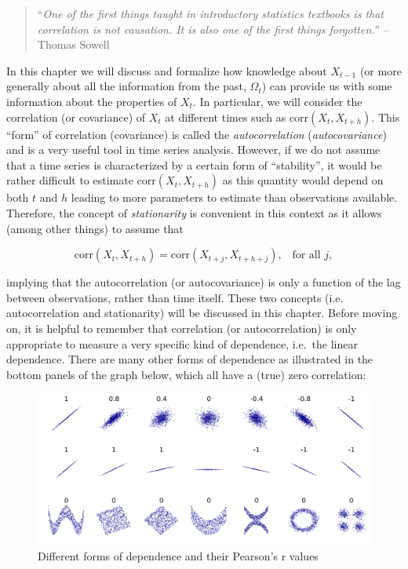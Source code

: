 \documentclass[]{book}
\theoremstyle{definition}
\theoremstyle{definition}
\theoremstyle{definition}
\theoremstyle{remark}
\begin{document}
\begin{quote}
``\emph{One of the first things taught in introductory statistics
textbooks is that correlation is not causation. It is also one of the
first things forgotten.}'' -- Thomas Sowell
\end{quote}

In this chapter we will discuss and formalize how knowledge about
\(X_{t-1}\) (or more generally about all the information from the past,
\(\Omega_t\)) can provide us with some information about the properties
of \(X_t\). In particular, we will consider the correlation (or
covariance) of \(X_t\) at different times such as
\(\text{corr} \left(X_t, X_{t+h}\right)\). This ``form'' of correlation
(covariance) is called the \emph{autocorrelation}
(\emph{autocovariance}) and is a very useful tool in time series
analysis. However, if we do not assume that a time series is
characterized by a certain form of ``stability'', it would be rather
difficult to estimate \(\text{corr} \left(X_t, X_{t+h}\right)\) as this
quantity would depend on both \(t\) and \(h\) leading to more parameters
to estimate than observations available. Therefore, the concept of
\emph{stationarity} is convenient in this context as it allows (among
other things) to assume that

\[\text{corr} \left(X_t, X_{t+h}\right) = \text{corr} \left(X_{t+j}, X_{t+h+j}\right), \;\;\; \text{for all $j$},\]

implying that the autocorrelation (or autocovariance) is only a function
of the lag between observations, rather than time itself. These two
concepts (i.e. autocorrelation and stationarity) will be discussed in
this chapter. Before moving on, it is helpful to remember that
correlation (or autocorrelation) is only appropriate to measure a very
specific kind of dependence, i.e.~the linear dependence. There are many
other forms of dependence as illustrated in the bottom panels of the
graph below, which all have a (true) zero correlation:

\begin{figure}

{\centering \includegraphics[width=17.78in]{images/corr_example} 

}

\caption{Different forms of dependence and their Pearson's r values}\label{fig:correxample}
\end{figure}
\end{document}
